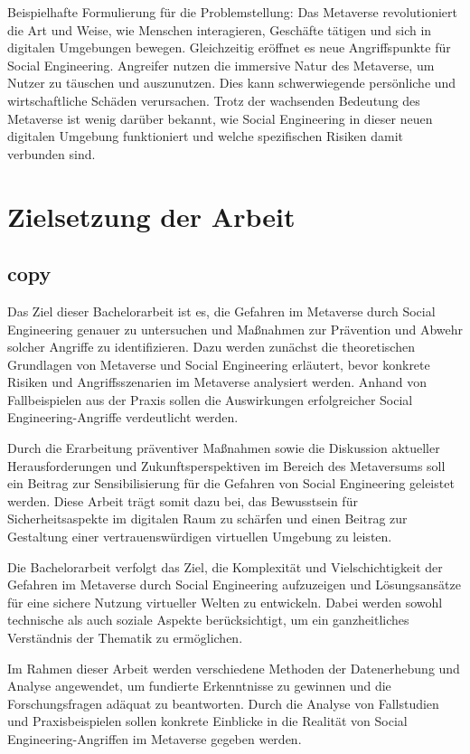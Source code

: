 Beispielhafte Formulierung für die Problemstellung:
Das Metaverse revolutioniert die Art und Weise, wie Menschen interagieren, Geschäfte tätigen und sich in digitalen Umgebungen bewegen. Gleichzeitig eröffnet es neue Angriffspunkte für Social Engineering. Angreifer nutzen die immersive Natur des Metaverse, um Nutzer zu täuschen und auszunutzen. Dies kann schwerwiegende persönliche und wirtschaftliche Schäden verursachen. Trotz der wachsenden Bedeutung des Metaverse ist wenig darüber bekannt, wie Social Engineering in dieser neuen digitalen Umgebung funktioniert und welche spezifischen Risiken damit verbunden sind.


\section{Zielsetzung der Arbeit}
\subsection*{copy}


Das Ziel dieser Bachelorarbeit ist es, die Gefahren im Metaverse durch Social Engineering genauer zu untersuchen und Maßnahmen zur Prävention und Abwehr solcher Angriffe zu identifizieren. Dazu werden zunächst die theoretischen Grundlagen von Metaverse und Social Engineering erläutert, bevor konkrete Risiken und Angriffsszenarien im Metaverse analysiert werden. Anhand von Fallbeispielen aus der Praxis sollen die Auswirkungen erfolgreicher Social Engineering-Angriffe verdeutlicht werden.


Durch die Erarbeitung präventiver Maßnahmen sowie die Diskussion aktueller Herausforderungen und Zukunftsperspektiven im Bereich des Metaversums soll ein Beitrag zur Sensibilisierung für die Gefahren von Social Engineering geleistet werden. Diese Arbeit trägt somit dazu bei, das Bewusstsein für Sicherheitsaspekte im digitalen Raum zu schärfen und einen Beitrag zur Gestaltung einer vertrauenswürdigen virtuellen Umgebung zu leisten.

Die Bachelorarbeit verfolgt das Ziel, die Komplexität und Vielschichtigkeit der Gefahren im Metaverse durch Social Engineering aufzuzeigen und Lösungsansätze für eine sichere Nutzung virtueller Welten zu entwickeln. Dabei werden sowohl technische als auch soziale Aspekte berücksichtigt, um ein ganzheitliches Verständnis der Thematik zu ermöglichen.


Im Rahmen dieser Arbeit werden verschiedene Methoden der Datenerhebung und Analyse angewendet, um fundierte Erkenntnisse zu gewinnen und die Forschungsfragen adäquat zu beantworten. Durch die Analyse von Fallstudien und Praxisbeispielen sollen konkrete Einblicke in die Realität von Social Engineering-Angriffen im Metaverse gegeben werden.



